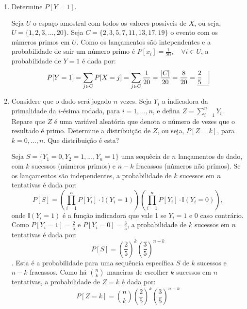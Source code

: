 \documentclass[12 pt]{article}
\begin{document}
\begin{enumerate}
    \item Determine $P [Y = 1]$.
    \begin{tcolorbox}[colframe=black, title=Resposta:]
        Seja $U$ o espaço amostral com todos os valores possíveis de $X$, ou seja, $U = \{1, 2, 3, \dots, 20\}$. Seja $C=\{2, 3, 5, 7, 11, 13, 17, 19\}$ o evento com os números primos em $U$. Como os lançamentos são intependentes e a probabilidade de sair um número primo é $P[x_i] = \frac{1}{20}, \quad \forall i \in U$, a probabilidade de $Y = 1$ é dada por:
        $$P[Y = 1] = \sum_{j \in C} P[X = j] = \sum_{j \in C} \frac{1}{20} = \frac{|C|}{20} = \frac{8}{20} = \underline{\frac{2}{5} \quad \vline}$$
    \end{tcolorbox}
    \newpage
    \item Considere que o dado será jogado $n$ vezes. Seja $Y_i$ a indicadora da primalidade da $i$-ésima rodada, para $i = 1, \dots, n$, e defina $Z = \sum_{i=1}^{n} Y_i$. Repare que $Z$ é uma variável aleatória que denota o número de vezes que o resultado é primo. Determine a distribuição de $Z$, ou seja, $P [Z = k]$, para $k = 0, \dots, n$. Que distribuição é esta?
    \begin{tcolorbox}[colframe=black, title=Resposta:]
        Seja $S=\{Y_1=0, Y_2=1, ..., Y_n=1\}$ uma sequêcia de $n$ lançamentos de dado, com $k$ sucessos (números primos) e $n-k$ fracassos (números não primos). Se os lançamentos são independentes, a probabilidade de $k$ sucessos em $n$ tentativas é dada por:
        $$P[S] = \left(\prod_{i=1}^{n} P[Y_i] \cdot \mathbb{I}(Y_i = 1) \right) \left(\prod_{i=1}^{n} P[Y_i] \cdot \mathbb{I}(Y_i = 0) \right),$$
        onde $\mathbb{I}(Y_i = 1)$ é a função indicadora que vale 1 se $Y_i = 1$ e 0 caso contrário. Como $P[Y_i = 1] = \frac{2}{5}$ e $P[Y_i = 0] = \frac{3}{5}$, a probabilidade de $k$ sucessos em $n$ tentativas é dada por:
        $$P[S] = \left(\frac{2}{5}\right)^k \left(\frac{3}{5}\right)^{n-k}$$.
        Esta é a probabilidade para uma sequência específica $S$ de $k$ sucessos e $n-k$ fracassos. Como há $\binom{n}{k}$ maneiras de escolher $k$ sucessos em $n$ tentativas, a probabilidade de $Z = k$ é dada por:
        $$\boxed{P[Z = k] = \binom{n}{k} \left(\frac{2}{5}\right)^k \left(\frac{3}{5}\right)^{n-k}}$$


\end{tcolorbox}
\end{enumerate}
\end{document}
